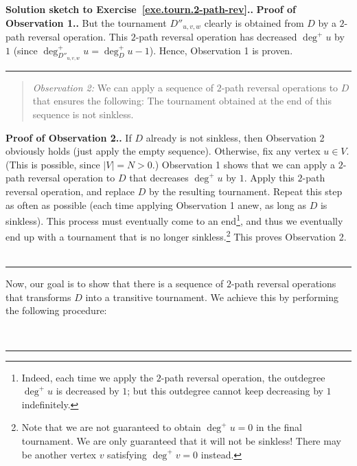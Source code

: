 \documentclass[numbers=enddot,12pt,final,onecolumn,notitlepage]{scrartcl}%
\theoremstyle{definition}
\newenvironment{statement}{\begin{quote}}{\end{quote}}
\newenvironment{proof}[1][Proof]{\noindent\textbf{#1.} }{\ \rule{0.5em}{0.5em}}
\newcommand{\abs}[1]{\left| #1 \right|}
\begin{document}
\begin{proof}[Solution sketch to Exercise~\ref{exe.tourn.2-path-rev}.]
\begin{proof}[Proof of Observation 1.]
But the tournament $D''_{u, v, w}$ clearly is obtained from $D$ by a
$2$-path reversal operation. This $2$-path reversal operation has
decreased $\deg^+ u$ by $1$
(since $\deg^+_{D''_{u, v, w}} u = \deg^+_{D} u - 1$). Hence,
Observation 1 is proven.
\end{proof}

\begin{statement}
\textit{Observation 2:} We can apply a sequence of $2$-path reversal
operations to $D$ that ensures the following: The tournament obtained
at the end of this sequence is not sinkless.
\end{statement}
\begin{proof}[Proof of Observation 2.]
If $D$ already is not sinkless, then Observation 2 obviously holds
(just apply the empty sequence). Otherwise, fix any vertex $u \in V$.
(This is possible, since $\abs{V} = N > 0$.) Observation 1 shows that
we can apply a $2$-path reversal operation to $D$ that decreases
$\deg^+ u$ by $1$. Apply this $2$-path reversal operation, and replace
$D$ by the resulting tournament. Repeat this step as often as
possible (each time applying Observation 1 anew, as long as $D$ is
sinkless). This process must eventually come to an
end\footnote{Indeed, each time we apply the $2$-path reversal
operation, the outdegree $\deg^+ u$ is decreased by $1$; but this
outdegree cannot keep decreasing by $1$ indefinitely.}, and thus we
eventually end up with a tournament that is no longer
sinkless.\footnote{Note that we are not guaranteed to obtain
$\deg^+ u = 0$ in the final tournament. We are only guaranteed that it
will not be sinkless! There may be another vertex $v$ satisfying
$\deg^+ v = 0$ instead.}
This proves Observation 2.
\end{proof}

Now, our goal is to show that there is a sequence of $2$-path reversal
operations that transforms $D$ into a transitive tournament. We
achieve this by performing the following procedure:


\end{proof}
\end{document}
